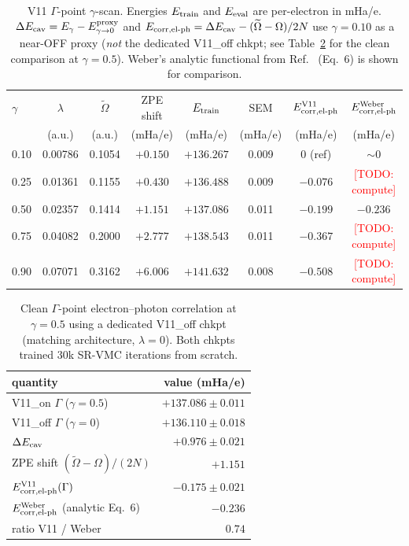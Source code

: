 \documentclass[reprint,amsmath,amssymb,aps,prb,floatfix,nofootinbib]{revtex4-2}
\newcommand{\todo}[1]{\textcolor{red}{[TODO: #1]}}
\newcommand{\Ehp}{E_{\mathrm{corr},\mathrm{el}\text{-}\mathrm{ph}}}
\newcommand{\Oeff}{\widetilde{\Omega}}
\begin{document}
\begin{table}
\caption{V11 $\Gamma$-point $\gamma$-scan.  Energies $E_{\rm train}$
         and $E_{\rm eval}$ are per-electron in mHa/e.
         $\Delta E_{\rm cav} = E_\gamma - E_{\gamma\to0}^{\rm proxy}$
         and $\Ehp = \Delta E_{\rm cav} - (\Oeff - \Omega)/2N$ use
         $\gamma = 0.10$ as a near-OFF proxy (\emph{not} the dedicated
         V11\_off chkpt; see Table~\ref{tab:gamma-clean} for the
         clean comparison at $\gamma = 0.5$).  Weber's analytic
         functional from Ref.~\cite{Weber2024} (Eq.~6) is shown for
         comparison.}
\label{tab:gamma-scan}
\begin{ruledtabular}
\begin{tabular}{l|c|c|c|cc|c|c}
$\gamma$ & $\lambda$ & $\Oeff$ & ZPE shift & $E_{\rm train}$ & SEM &
$\Ehp^{\rm V11}$ & $\Ehp^{\rm Weber}$ \\
& (a.u.) & (a.u.) & (mHa/e) & (mHa/e) & (mHa/e) & (mHa/e) & (mHa/e) \\
\hline
0.10 & 0.00786 & 0.1054 & $+0.150$ & $+136.267$ & 0.009 & 0    (ref) & $\sim$0    \\
0.25 & 0.01361 & 0.1155 & $+0.430$ & $+136.488$ & 0.009 & $-0.076$ & \todo{compute} \\
0.50 & 0.02357 & 0.1414 & $+1.151$ & $+137.086$ & 0.011 & $-0.199$ & $-0.236$ \\
0.75 & 0.04082 & 0.2000 & $+2.777$ & $+138.543$ & 0.011 & $-0.367$ & \todo{compute} \\
0.90 & 0.07071 & 0.3162 & $+6.006$ & $+141.632$ & 0.008 & $-0.508$ & \todo{compute} \\
\end{tabular}
\end{ruledtabular}
\end{table}

\begin{table}
\caption{Clean $\Gamma$-point electron--photon correlation at
         $\gamma = 0.5$ using a dedicated V11\_off chkpt (matching
         architecture, $\lambda = 0$).  Both chkpts trained 30k
         SR-VMC iterations from scratch.}
\label{tab:gamma-clean}
\begin{ruledtabular}
\begin{tabular}{l|r}
quantity                                   & value (mHa/e) \\
\hline
V11\_on  $\Gamma$ ($\gamma = 0.5$)         & $+137.086 \pm 0.011$ \\
V11\_off $\Gamma$ ($\gamma = 0$)           & $+136.110 \pm 0.018$ \\
$\Delta E_{\rm cav}$                       & $+0.976 \pm 0.021$ \\
ZPE shift $(\Oeff - \Omega)/(2N)$          & $+1.151$ \\
\hline
$\Ehp^{\rm V11}(\Gamma)$                   & $\mathbf{-0.175 \pm 0.021}$ \\
$\Ehp^{\rm Weber}$ (analytic Eq.~6)        & $\mathbf{-0.236}$ \\
ratio V11 / Weber                          & $0.74$ \\
\end{tabular}
\end{ruledtabular}
\end{table}
\end{document}
